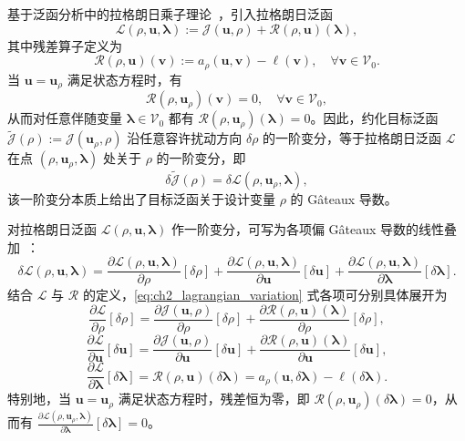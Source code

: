 基于泛函分析中的拉格朗日乘子理论~\cite{luenbergerOptimizationVectorSpace1969}，引入拉格朗日泛函
\[
\mathcal{L}(\rho,\boldsymbol{u},\boldsymbol{\lambda}) := \mathcal{J}(\boldsymbol{u}, \rho) + \mathcal{R}(\rho,\boldsymbol{u})(\boldsymbol\lambda),
\]
其中残差算子定义为
\begin{equation}
	\mathcal{R}(\rho,\boldsymbol{u})(\boldsymbol{v}) := a_\rho(\boldsymbol{u},\boldsymbol{v}) - \ell(\boldsymbol{v}),\quad\forall\boldsymbol{v}\in\mathcal{V}_0.
	\label{eq:ch2_residual_operator}
\end{equation}
当 $\boldsymbol{u}=\boldsymbol{u}_\rho$ 满足状态方程时，有
\[
\mathcal{R}(\rho,\boldsymbol{u}_\rho)(\boldsymbol{v}) = 0,\quad\forall\boldsymbol{v}\in\mathcal{V}_0,
\]
从而对任意伴随变量 $\boldsymbol{\lambda}\in\mathcal{V}_0$ 都有 $\mathcal{R}(\rho,\boldsymbol{u}_\rho)(\boldsymbol{\lambda}) = 0$。因此，约化目标泛函 $\tilde{\mathcal{J}}(\rho) := \mathcal{J}(\boldsymbol{u}_\rho, \rho)$ 沿任意容许扰动方向 $\delta\rho$ 的一阶变分，等于拉格朗日泛函 $\mathcal{L}$ 在点 $(\rho,\boldsymbol{u}_\rho,\boldsymbol{\lambda})$ 处关于 $\rho$ 的一阶变分，即
\[
\delta\tilde{\mathcal{J}}(\rho) = \delta\mathcal{L}(\rho,\boldsymbol{u}_\rho,\boldsymbol{\lambda}),
\]
该一阶变分本质上给出了目标泛函关于设计变量 $\rho$ 的 Gâteaux 导数。

对拉格朗日泛函 $\mathcal{L}(\rho,\boldsymbol{u},\boldsymbol{\lambda})$ 作一阶变分，可写为各项偏 Gâteaux 导数的线性叠加~\cite{luenbergerOptimizationVectorSpace1969}：
\begin{equation} 
	\delta\mathcal{L}(\rho,\boldsymbol{u},\boldsymbol{\lambda}) = \frac{\partial\mathcal{L}(\rho,\boldsymbol{u},\boldsymbol{\lambda})}{\partial\rho}[\delta\rho] + \frac{\partial\mathcal{L}(\rho,\boldsymbol{u},\boldsymbol{\lambda})}{\partial\boldsymbol{u}}[\delta\boldsymbol{u}] + \frac{\partial\mathcal{L}(\rho,\boldsymbol{u},\boldsymbol{\lambda})}{\partial\boldsymbol\lambda}[\delta\boldsymbol\lambda].
	\label{eq:ch2_lagrangian_variation}
\end{equation}
结合 $\mathcal{L}$ 与 $\mathcal{R}$ 的定义，\eqref{eq:ch2_lagrangian_variation} 式各项可分别具体展开为
\[
\frac{\partial\mathcal{L}}{\partial\rho}[\delta\rho] = \frac{\partial\mathcal{J}( \boldsymbol{u},\rho)}{\partial\rho}[\delta\rho] + \frac{\partial\mathcal{R}(\rho,\boldsymbol{u})(\boldsymbol\lambda)}{\partial\rho}[\delta\rho],
\]
\[
\frac{\partial\mathcal{L}}{\partial\boldsymbol{u}}[\delta\boldsymbol{u}] = \frac{\partial\mathcal{J}( \boldsymbol{u},\rho)}{\partial\boldsymbol{u}}[\delta\boldsymbol{u}] + \frac{\partial\mathcal{R}(\rho,\boldsymbol{u})(\boldsymbol\lambda)}{\partial\boldsymbol{u}}[\delta\boldsymbol{u}],
\]
\[
\frac{\partial\mathcal{L}}{\partial\boldsymbol\lambda}[\delta\boldsymbol\lambda] = \mathcal{R}(\rho,\boldsymbol{u})(\delta\boldsymbol{\lambda}) = a_\rho(\boldsymbol{u},\delta\boldsymbol\lambda) - \ell(\delta\boldsymbol\lambda).
\]
特别地，当 $\boldsymbol{u}=\boldsymbol{u}_\rho$ 满足状态方程时，残差恒为零，即 $\mathcal{R}(\rho,\boldsymbol{u}_\rho)(\delta\boldsymbol{\lambda})=0$，从而有 $\frac{\partial\mathcal{L}(\rho,\boldsymbol{u}_\rho,\boldsymbol{\lambda})}{\partial\boldsymbol\lambda}[\delta\boldsymbol\lambda] = 0$。

